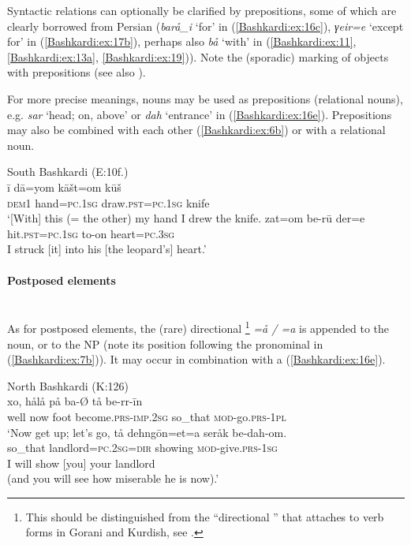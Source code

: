 \documentclass[output=paper,colorlinks,citecolor=brown]{langscibook}
\begin{document}
{\noindent}Syntactic relations can optionally be clarified by prepositions, some of which are clearly borrowed from Persian (\textit{barå\_i} `for' in (\ref{Bashkardi:ex:16c}), \textit{γeir=e} `except for' in (\ref{Bashkardi:ex:17b}), perhaps also \textit{bå} `with' in (\ref{Bashkardi:ex:11}, \ref{Bashkardi:ex:13a}, \ref{Bashkardi:ex:19})). Note the (sporadic) marking of objects with prepositions (see also ).

For more precise meanings, nouns may be used as prepositions (relational nouns), e.g. \textit{sar} `head; on, above' or \textit{dah} `entrance' in (\ref{Bashkardi:ex:16e}). Prepositions may also be combined with each other (\ref{Bashkardi:ex:6b}) or with a relational noun. 

\ea\label{Bashkardi:ex:6}
South Bashkardi (E:10f.) \\
\ea\label{Bashkardi:ex:6a}
\gll ī dā=yom kāšt=om kūš \\
\textsc{dem1} hand\textsc{=pc.1sg}{\footnotemark} draw\textsc{.pst}\textsc{=pc.1sg} knife \\
\glt `[With] this (= the other) my hand I drew the knife.
\ex\label{Bashkardi:ex:6b}
\gll zat=om be-rū der=e \\
hit\textsc{.pst}\textsc{=pc.1sg} to-on heart\textsc{=pc.3sg} \\
\glt I struck [it] into his [the leopard's] heart.'
\z
\z{}

\paragraph{Postposed elements}\label{Bashkardi:ss:2.1.3.2}\mbox{}\\

{\noindent}As for postposed elements, the (rare) directional \footnote{
This  should be distinguished from the ``directional '' that attaches to verb forms in Gorani and Kurdish, see .
} \textit{=å / =a} is appended to the noun, or to the NP (note its position following the pronominal  in (\ref{Bashkardi:ex:7b})). It may occur in combination with a  (\ref{Bashkardi:ex:16e}). 


\ea\label{Bashkardi:ex:7}
North Bashkardi (K:126) \\
\ea\label{Bashkardi:ex:7a}
\gll xo, hålå på ba\textup{-\O} tå be-rr-īn \\ 
well now foot become\textsc{.prs}\textsc{\textsc{-imp}\textsc{.2sg}} so\_that \textsc{mod-}go\textsc{.prs}\textsc{-1pl} \\ 
\glt `Now get up; let's go,
\ex\label{Bashkardi:ex:7b}
\gll tå dehngōn\textup{\footnotemark}=et=a seråk be-dah-om. \\ 
so{\_}that landlord\textsc{=pc\textsc{.2sg}}\textsc{=dir} showing \textsc{mod-}give\textsc{.prs}\textsc{-1sg} \\
\glt [and] I will show [you] your landlord \\ (and you will see how miserable he is now).'
\z
\z
\end{document}
